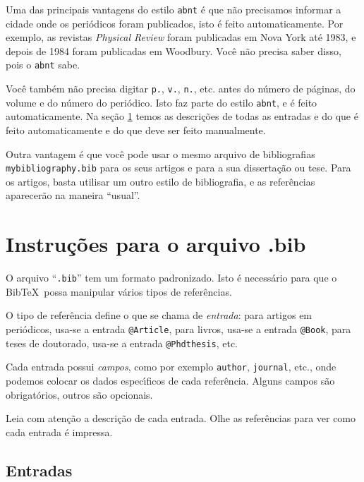 \documentclass[a4paper,12pt]{article}
\newcommand{\ii}{\'{\i}}
\newcommand{\ca}{\c{c}\~ao}
\newcommand{\co}{\c{c}\~oes}
\begin{document}
			
			Uma das principais vantagens do estilo \verb+abnt+ \'e que n\~ao
			precisamos informar a cidade onde os peri\'odicos foram publicados,
			isto \'e feito automaticamente. Por exemplo, as revistas 
			{\em Physical Review} foram publicadas em Nova York at\'e 1983, e depois de
			1984 foram publicadas em Woodbury. Voc\^e n\~ao precisa
			saber disso, pois o \verb+abnt+ sabe.
			
			Voc\^e tamb\'em n\~ao precisa digitar \verb+p.+, \verb+v.+, \verb+n.+,
			etc. antes do n\'umero de p\'aginas, do volume e do n\'umero
			do peri\'odico. Isto faz parte do estilo \verb+abnt+, e
			\'e feito automaticamente. Na se{\ca} \ref{entradas} temos as
			descri{\co} de todas as entradas e do que \'e feito
			automaticamente e do que deve ser feito manualmente.
			
			Outra vantagem \'e que voc\^e pode usar o mesmo arquivo
			de bibliografias
			\verb+mybibliography.bib+ para os seus artigos e para a sua 
			disserta{\ca} ou tese. Para os artigos, basta utilisar um outro
			estilo de bibliografia, e as refer\^encias aparecer\~ao na maneira
			``usual''.
			
			
			
			
			\section{Instru{\co} para o arquivo .bib}
			\label{entradas}
			
			
			O arquivo ``\verb+.bib+'' tem um formato padronizado.
			Isto \'e necess\'ario para que o Bib\TeX\ possa manipular
			v\'arios tipos de refer\^encias.
			
			O tipo de refer\^encia define o que se chama de {\it entrada}:
			para artigos em peri\'odicos, usa-se a entrada \verb+@Article+, para
			livros, usa-se a entrada \verb+@Book+, para teses de doutorado,
			usa-se a entrada \verb+@Phdthesis+, etc. 
			
			Cada entrada possui {\it campos},
			como por exemplo \verb+author+, \verb+journal+, etc., onde podemos
			colocar os dados espec{\ii}ficos de cada refer\^encia.
			Alguns campos s\~ao obrigat\'orios, outros s\~ao opcionais.
			
			Leia com aten{\ca} a descri{\ca} de cada entrada. 
			Olhe as refer\^encias para ver como cada entrada \'e impressa.
			
			
			\subsection{Entradas}
			
\end{document}
